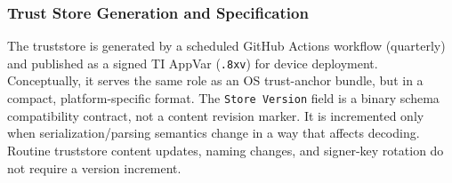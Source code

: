 \documentclass[titlepage]{report}
\begin{document}
	\subsubsection{Trust Store Generation and Specification}
	
	The truststore is generated by a scheduled GitHub Actions workflow (quarterly) and published as a signed TI AppVar (\texttt{.8xv}) for device deployment. Conceptually, it serves the same role as an OS trust-anchor bundle, but in a compact, platform-specific format.
	The \texttt{Store Version} field is a binary schema compatibility contract, not a content revision marker. It is incremented only when serialization/parsing semantics change in a way that affects decoding. Routine truststore content updates, naming changes, and signer-key rotation do not require a version increment.
	
\end{document}

